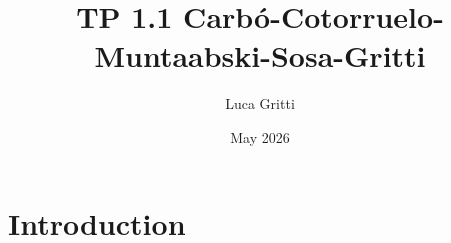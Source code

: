 \documentclass{article}
\title{TP 1.1 Carbó-Cotorruelo-Muntaabski-Sosa-Gritti}
\author{Luca Gritti}
\date{May 2026}
\begin{document}
\maketitle

\section{Introduction}
\end{document}
